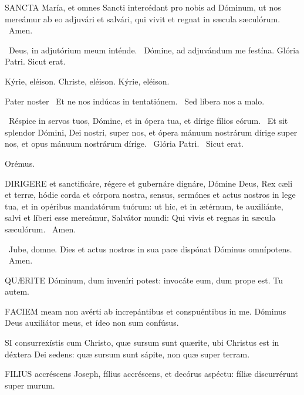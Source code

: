 
\lettrine[lines=2]{S}{ANCTA} María, et omnes Sancti intercédant pro nobis ad Dóminum, ut nos mereámur ab eo adjuvári et salvári, qui vivit et regnat in sæcula sæculórum. \R\ Amen.

\V\ Deus, in adjutórium meum inténde. \R\ Dómine, ad adjuvándum me festína.  Glória Patri. Sicut erat.

Kýrie, eléison. Christe, eléison. Kýrie, eléison.

Pater noster  \V\ Et ne nos indúcas in tentatiónem. \R\ Sed líbera nos a malo.

\V\ Réspice in servos tuos, Dómine, et in ópera tua, et dírige fílios eórum. \R\ Et sit splendor Dómini, Dei nostri, super nos, et ópera mánuum nostrárum dírige super nos, et opus mánuum nostrárum dírige. \V\ Glória Patri. \R\ Sicut erat.

Orémus. 

\lettrine[lines=2]{D}{IRIGERE} et sanctificáre, régere et gubernáre dignáre, Dómine Deus, Rex cæli et terræ, hódie corda et córpora nostra, sensus, sermónes et actus nostros in lege tua, et in opéribus mandatórum tuórum: ut hic, et in ætérnum, te auxiliánte, salvi et líberi esse mereámur, Salvátor mundi: Qui vivis et regnas in sæcula sæculórum. \R\ Amen.

\V\ Jube, domne.  Dies et actus nostros in sua pace dispónat Dóminus omnípotens. \R\ Amen.



\lettrine[lines=2]{Q}{UÆRITE} Dóminum, dum inveníri potest: invocáte eum, dum prope est. Tu autem.


\lettrine[lines=2]{F}{ACIEM} meam non avérti ab increpántibus et conspuéntibus in me. Dóminus Deus auxiliátor meus, et ídeo non sum confúsus.


\lettrine[lines=2]{S}{I} consurrexístis cum Christo, quæ sursum sunt quærite, ubi Christus est in déxtera Dei sedens: quæ sursum sunt sápite, non quæ super terram.



\lettrine[lines=2]{F}{ILIUS} accréscens Joseph, fílius accréscens, et decórus aspéctu: fíliæ discurrérunt super murum.

